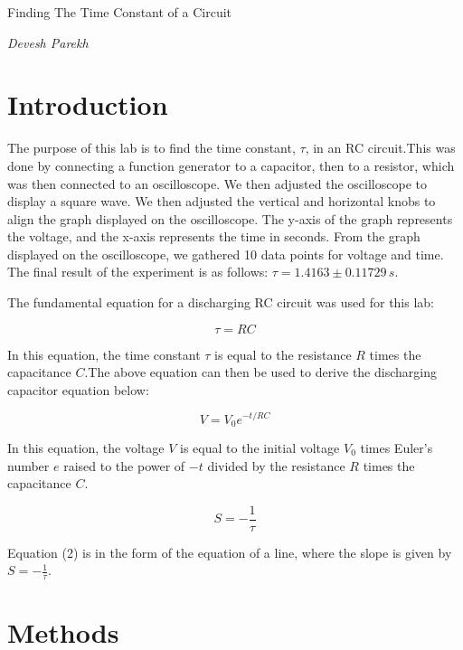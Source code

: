 \documentclass[onecolumn]{article}
\begin{document}
\begin{center}

{\Huge Finding The Time Constant of a Circuit}\vskip 20pt

{\huge \em Devesh Parekh}

\end{center}

\section*{Introduction}

The purpose of this lab is to find the time constant, $\tau$, in an RC circuit.This was done by connecting a function generator to a capacitor, then to a resistor, which was then connected to an oscilloscope. We then adjusted the oscilloscope to display a square wave. We then adjusted the vertical and horizontal knobs to align the graph displayed on the oscilloscope. The y-axis of the graph represents the voltage, and the x-axis represents the time in seconds. From the graph displayed on the oscilloscope, we gathered 10 data points for voltage and time. The final result of the experiment is as follows: $\tau = 1.4163 \pm 0.11729\,s$.

The fundamental equation for a discharging RC circuit was used for this lab:

\begin{equation}
\tau = RC
\end{equation}

In this equation, the time constant $\tau$ is equal to the resistance $R$ times the capacitance $C$.The above equation can then be used to derive the discharging capacitor equation below:

\begin{equation}
V = V_0e^{-t/RC}
\end{equation}

In this equation, the voltage $V$ is equal to the initial voltage $V_0$ times Euler's number $e$ raised to the power of $-t$ divided by the resistance $R$ times the capacitance $C$.

\begin{equation}
S = -\frac{1}{\tau}
\end{equation}

Equation (2) is in the form of the equation of a line, where the slope is given by $S=-\frac{1}{\tau}$.

\section*{Methods}
\end{document}
